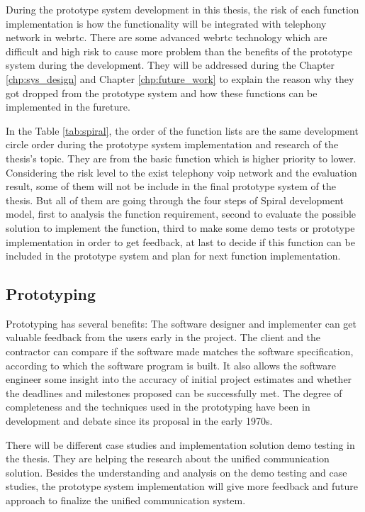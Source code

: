 \par During the prototype system development in this thesis, the risk of each function implementation is how the functionality will be integrated with telephony network in \gls{webrtc}. There are some advanced \gls{webrtc} technology which are difficult and high risk to cause more problem than the benefits of the prototype system during the development. They will be addressed during the Chapter \ref{chp:sys_design} and Chapter \ref{chp:future_work} to explain the reason why they got dropped from the prototype system and how these functions can be implemented in the fureture.

\par In the Table \ref{tab:spiral}, the order of the function lists are the same development circle order during the prototype system implementation and research of the thesis's topic. They are from the basic function which is higher priority to lower. Considering the risk level to the exist telephony \gls{voip} network and the evaluation result, some of them will not be include in the final prototype system of the thesis. But all of them are going through the four steps of Spiral development model, first to analysis the function requirement, second to evaluate the possible solution to implement the function, third to make some demo tests or prototype implementation in order to get feedback, at last to decide if this function can be included in the prototype system and plan for next function implementation.

\subsection{Prototyping}

\par Prototyping has several benefits: The software designer and implementer can get valuable feedback from the users early in the project. The client and the contractor can compare if the software made matches the software specification, according to which the software program is built. It also allows the software engineer some insight into the accuracy of initial project estimates and whether the deadlines and milestones proposed can be successfully met. The degree of completeness and the techniques used in the prototyping have been in development and debate since its proposal in the early 1970s.\cite{wiki:prototyping}

\par There will be different case studies and implementation solution demo testing in the thesis. They are helping the research about the unified communication solution. Besides the understanding and analysis on the demo testing and case studies, the prototype system implementation will give more feedback and future approach to finalize the unified communication system.

